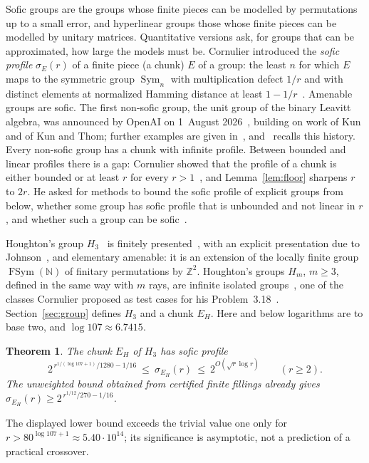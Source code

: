 \documentclass[11pt,a4paper]{article}
\theoremstyle{plain}
\newtheorem{theorem}{Theorem}[section]
\theoremstyle{definition}
\theoremstyle{remark}
\DeclareMathOperator{\Sym}{Sym}
\DeclareMathOperator{\FSym}{FSym}
\begin{document}
Sofic groups are the groups whose finite pieces can be modelled by permutations up to a small error, and hyperlinear groups those
whose finite pieces can be modelled by unitary matrices. Quantitative versions ask, for groups that can be approximated, how large the models must be.
Cornulier introduced the \emph{sofic profile} $\sigma_E(r)$ of a finite piece (a chunk)
$E$ of a group: the least $n$ for which $E$ maps to the symmetric group $\Sym_n$ with multiplication defect $1/r$ and with distinct
elements at normalized Hamming distance at least $1-1/r$~\cite{Cornulier2013}. Amenable groups are sofic. The first non-sofic group, the
unit group of the binary Leavitt algebra, was announced by OpenAI on 1~August 2026~\cite{OpenAI2026}, building on work of Kun and of Kun
and Thom; further examples are given in~\cite{FournierFacio2026,KunThom2026}, and~\cite{FournierFacio2026} recalls this history. Every
non-sofic group has a chunk with infinite profile. Between bounded and linear profiles there is a gap: Cornulier showed that the profile
of a chunk is either bounded or at least $r$ for every $r>1$~\cite[Fact~3.5]{Cornulier2013}, and Lemma~\ref{lem:floor} sharpens $r$ to
$2r$. He asked for
methods to bound the sofic profile of explicit groups from below, whether some group has sofic profile that is unbounded and not linear
in $r$, and whether such a group can be sofic~\cite[Problem~3.18]{Cornulier2013}.

Houghton's group $H_3$~\cite{Houghton1978} is finitely presented~\cite{Brown1987}, with an explicit presentation due to
Johnson~\cite{Johnson1999}, and elementary amenable: it is an
extension of the locally finite group $\FSym(\mathbb N)$ of finitary permutations by $\mathbb Z^2$. Houghton's groups $H_m$, $m\ge3$,
defined in the same way with $m$ rays, are infinite isolated groups~\cite[Section~5.3]{CGP07}, one of the classes Cornulier proposed as
test cases for his Problem~3.18~\cite[Example~3.19]{Cornulier2013}. Section~\ref{sec:group} defines $H_3$ and a chunk $E_H$. Here and below logarithms are to base two, and $\log107\approx6.7415$.

\begin{theorem}\label{thm:sofic}
The chunk $E_H$ of $H_3$ has sofic profile
\[
2^{\,r^{1/(\log107+1)}/1280-1/16}\ \le\ \sigma_{E_H}(r)\ \le\ 2^{O(\sqrt r\log r)}\qquad(r\ge2).
\]
The unweighted bound obtained from certified finite fillings already gives $\sigma_{E_H}(r)\ge2^{\,r^{1/12}/270-1/16}$.
\end{theorem}

The displayed lower bound exceeds the trivial value one only for
$r>80^{\log107+1}\approx5.40\cdot10^{14}$; its significance is asymptotic, not a prediction of a practical crossover.
\end{document}
